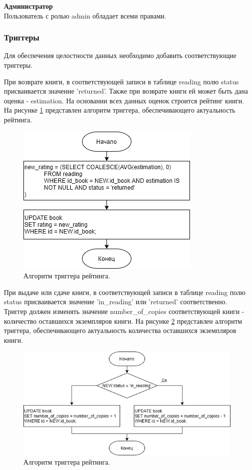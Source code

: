 \textbf{Администратор}\\
Пользователь с ролью admin обладает всеми правами.

\subsubsection{Триггеры}
Для обеспечения целостности данных необходимо добавить соответствующие триггеры. 

При возврате книги, в соответствующей записи в таблице reading полю status присваивается значение 'returned'. Также при возврате книги ей может быть дана оценка - estimation. На основании всех данных оценок строится рейтинг книги. На рисунке \ref{img:update_rating_trigger} представлен алгоритм триггера, обеспечивающего актуальность рейтинга.

\begin{figure}[h!]
	\centering
	\includegraphics[scale=1]{img/update_rating_trigger.png}
	\caption{Алгоритм триггера рейтинга.}
	\label{img:update_rating_trigger}
\end{figure}
\newpage

При выдаче или сдаче книги, в соответствующей записи в таблице reading полю status присваивается значение 'in\_reading' или 'returned' соответственно. Триггер должен изменять значение number\_of\_copies соответствующей книги - количество оставшихся экземпляров книги. На рисунке \ref{img:update_number_of_copies_trigger} представлен алгоритм триггера, обеспечивающего актуальность количества оставшихся экземпляров книги.

\begin{figure}[h!]
	\centering
	\includegraphics[scale=0.85]{img/update_number_of_copies_trigger.png}
	\caption{Алгоритм триггера рейтинга.}
	\label{img:update_number_of_copies_trigger}
\end{figure}
\newpage

